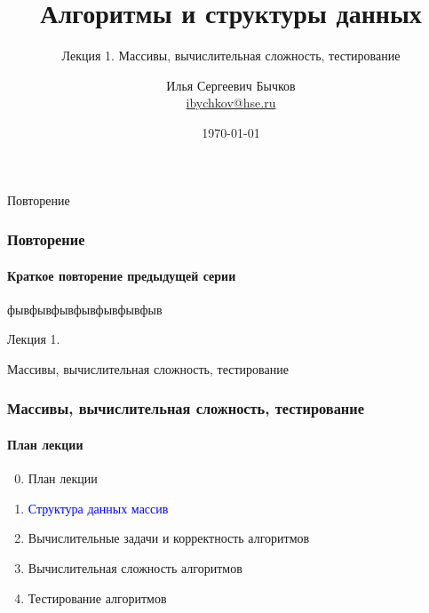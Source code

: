 \documentclass[aspectratio=169]{beamer}
\title[Title]{Алгоритмы и структуры данных}
\subtitle{Лекция 1. Массивы, вычислительная сложность, тестирование}
\author[Author's name]{Илья Сергеевич Бычков\\ \smallskip \scriptsize \url{ibychkov@hse.ru}}
\institute{НИУ ВШЭ - Нижний Новгород}
\date{\today}
\begin{document}
\frame[plain]{\titlepage}


\begin{frame}[c]

\begin{center}
\Huge Повторение
\end{center}

\end{frame}


\begin{frame}
\frametitle{Повторение}
\framesubtitle{Краткое повторение предыдущей серии}
фывфывфывфывфывфывфыв
\end{frame}

\begin{frame}[c]

\begin{center}
\Huge Лекция 1.

\Huge Массивы, вычислительная сложность, тестирование
\end{center}

\end{frame}

\begin{frame}
\frametitle{Массивы, вычислительная сложность, тестирование}
\framesubtitle{План лекции}

\begin{enumerate}
  \setcounter{enumi}{-1}
  \item{План лекции}
  \item{\textcolor{blue}{Структура данных массив}}
  \item{Вычислительные задачи и корректность алгоритмов}
  \item{Вычислительная сложность алгоритмов}
  \item{Тестирование алгоритмов}
\end{enumerate}
\end{frame}
\end{document}
